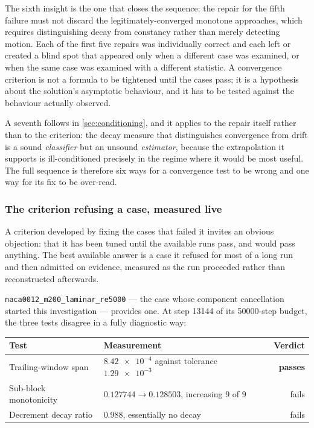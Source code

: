 The sixth insight is the one that closes the sequence: the repair for the fifth failure
must not discard the legitimately-converged monotone approaches, which requires
distinguishing decay from constancy rather than merely detecting motion. Each of the
first five repairs was individually correct and each left or created a blind spot that
appeared only when a different case was examined, or when the same case was examined
with a different statistic. A convergence criterion is not a formula to be tightened
until the cases pass; it is a hypothesis about the solution's asymptotic behaviour, and
it has to be tested against the behaviour actually observed.

A seventh follows in \cref{sec:conditioning}, and it applies to the repair itself rather
than to the criterion: the decay measure that distinguishes convergence from drift is a
sound \emph{classifier} but an unsound \emph{estimator}, because the extrapolation it
supports is ill-conditioned precisely in the regime where it would be most useful. The
full sequence is therefore six ways for a convergence test to be wrong and one way for
its fix to be over-read.

\subsubsection{The criterion refusing a case, measured live}
\label{sec:criterionworks}

A criterion developed by fixing the cases that failed it invites an obvious objection:
that it has been tuned until the available runs pass, and would pass anything. The best
available answer is a case it refused for most of a long run and then admitted on
evidence, measured as the run proceeded rather than reconstructed afterwards.

\texttt{naca0012\_m200\_laminar\_re5000} --- the case whose component cancellation
started this investigation --- provides one. At step \num{13144} of its \num{50000}-step
budget, the three tests disagree in a fully diagnostic way:

\begin{center}
\begin{tabular}{llr}
  \toprule
  Test & Measurement & Verdict \\
  \midrule
  Trailing-window span & $\num{8.42e-4}$ against tolerance $\num{1.29e-3}$
    & \textbf{passes} \\
  Sub-block monotonicity & $0.127744 \to 0.128503$, increasing $9$ of $9$
    & fails \\
  Decrement decay ratio & $0.988$, essentially no decay & fails \\
  \bottomrule
\end{tabular}
\end{center}

